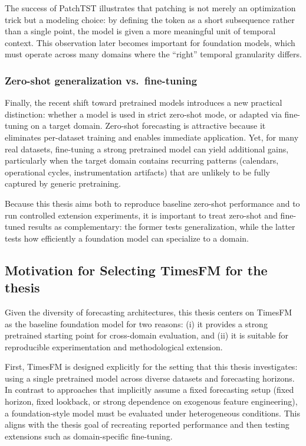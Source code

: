 The success of PatchTST illustrates that patching is not merely an optimization trick but a modeling choice: by defining the token as a short subsequence rather than a single point, the model is given a more meaningful unit of temporal context. This observation later becomes important for foundation models, which must operate across many domains where the ``right'' temporal granularity differs.

\subsubsection{Zero-shot generalization vs.\ fine-tuning}
Finally, the recent shift toward pretrained models introduces a new practical distinction: whether a model is used in strict zero-shot mode, or adapted via fine-tuning on a target domain. Zero-shot forecasting is attractive because it eliminates per-dataset training and enables immediate application. Yet, for many real datasets, fine-tuning a strong pretrained model can yield additional gains, particularly when the target domain contains recurring patterns (calendars, operational cycles, instrumentation artifacts) that are unlikely to be fully captured by generic pretraining.

Because this thesis aims both to reproduce baseline zero-shot performance and to run controlled extension experiments, it is important to treat zero-shot and fine-tuned results as complementary: the former tests generalization, while the latter tests how efficiently a foundation model can specialize to a domain.

\subsection{Motivation for Selecting TimesFM for the thesis} 

Given the diversity of forecasting architectures, this thesis centers on TimesFM as the baseline foundation model for two reasons: (i) it provides a strong pretrained starting point for cross-domain evaluation, and (ii) it is suitable for reproducible experimentation and methodological extension.

First, TimesFM is designed explicitly for the setting that this thesis investigates: using a single pretrained model across diverse datasets and forecasting horizons. In contrast to approaches that implicitly assume a fixed forecasting setup (fixed horizon, fixed lookback, or strong dependence on exogenous feature engineering), a foundation-style model must be evaluated under heterogeneous conditions. This aligns with the thesis goal of recreating reported performance and then testing extensions such as domain-specific fine-tuning.

